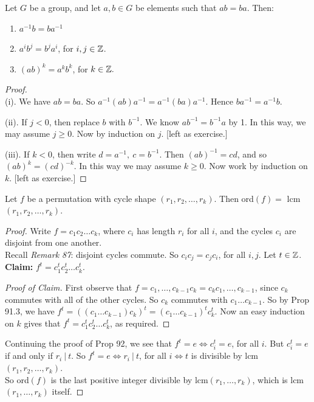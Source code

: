 \documentclass[10pt]{scrartcl}
\begin{document}
\begin{proposition}Let $G$ be a group, and let $a,b\in G$ be elements such that $ab = ba$. Then: \begin{enumerate}
 \item $a^{-1}b = ba^{-1}$
 \item $a^ib^j = b^ja^i$, for $i,j \in \mathbb{Z}$.
 \item $(ab)^k = a^kb^k$, for $k \in \mathbb{Z}.$	
 \end{enumerate}
 \end{proposition}
 
 \begin{proof}~\\[-.1cm]
 
 (i). We have $ab = ba.$ So $a^{-1}(ab)a^{-1} = a^{-1}(ba)a^{-1}$. Hence $ba^{-1} =  a^{-1}b$.
 
 (ii). If $j < 0$, then replace $b$ with $b^{-1}$. We know $ab^{-1} = b^{-1}a$ by 1. In this way, we may assume $j \geq 0$. Now by induction on $j$. [left as exercise.]
 
 (iii). If $k < 0$, then write $d = a^{-1},~c = b^{-1}$. Then $(ab)^{-1} = cd$, and so $(ab)^k = (cd)^{-k}$. In this way we may assume $k \geq 0$. Now work by induction on $k$. [left as exercise.]
 \end{proof}\vspace*{5pt}

 
 
\begin{proposition} Let $f$ be a permutation with cycle shape $(r_1,r_2,\dots,r_k)$. Then ord$(f) =$ lcm$(r_1,r_2,\dots,r_k)$.	
\end{proposition}


 \begin{proof} 

Write   $f = c_1c_2\dots c_k$, where $c_i$ has length $r_i$ for all $i$, and the cycles $c_i$ are disjoint from one another.\\

Recall \textit{Remark 87}: disjoint cycles commute. So $c_ic_j = c_jc_i$, for all $i,j$. Let $t \in \mathbb{Z}$. \textbf{Claim:} $f^t = c_1^tc_2^t\dots c_k^t$. 
\begin{proof}[Proof of Claim] First observe that $f = c_1,\dots,c_{k-1}c_k = c_kc_1,\dots,c_{k-1}$, since $c_k$ commutes with all of the other cycles. So $c_k$ commutes with $c_1\dots c_{k-1}$. So by Prop 91.3, we have $f^t = ((c_1\dots c_{k-1})c_k)^t =(c_1\dots c_{k-1})^t  c_k^t $. Now an easy induction on $k$ gives that $f^t = c_1^tc_2^t\dots c_k^t$, as required.
\end{proof}

Continuing the proof of Prop 92, we see that $f^t = e \iff c_i^t = e$, for all $i$. But $c_i^t = e$ if and only if $r_i ~|~ t$. So $f^t = e \iff r_i ~|~ t$, for all $i \iff t$ is divisible by lcm$(r_1,r_2,\dots,r_k)$.\\

So ord$(f)$ is the last positive integer divisible by lcm$(r_1,\dots,r_k)$, which is lcm$(r_1,\dots,r_k)$ itself.
 \end{proof}\vspace*{10pt}
 
\end{document}
